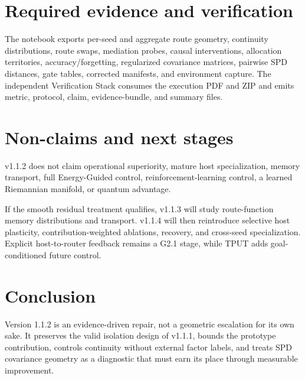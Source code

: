 \documentclass[11pt,a4paper]{article}
\begin{document}
\section{Required evidence and verification}
The notebook exports per-seed and aggregate route geometry, continuity distributions, route swaps, mediation probes, causal interventions, allocation territories, accuracy/forgetting, regularized covariance matrices, pairwise SPD distances, gate tables, corrected manifests, and environment capture. The independent Verification Stack consumes the execution PDF and ZIP and emits metric, protocol, claim, evidence-bundle, and summary files.
\section{Non-claims and next stages}
\begin{claimbox}
v1.1.2 does not claim operational superiority, mature host specialization, memory transport, full Energy-Guided control, reinforcement-learning control, a learned Riemannian manifold, or quantum advantage.
\end{claimbox}
If the smooth residual treatment qualifies, v1.1.3 will study route-function memory distributions and transport. v1.1.4 will then reintroduce selective host plasticity, contribution-weighted ablations, recovery, and cross-seed specialization. Explicit host-to-router feedback remains a G2.1 stage, while TPUT adds goal-conditioned future control.
\section{Conclusion}
Version 1.1.2 is an evidence-driven repair, not a geometric escalation for its own sake. It preserves the valid isolation design of v1.1.1, bounds the prototype contribution, controls continuity without external factor labels, and treats SPD covariance geometry as a diagnostic that must earn its place through measurable improvement.
\end{document}
